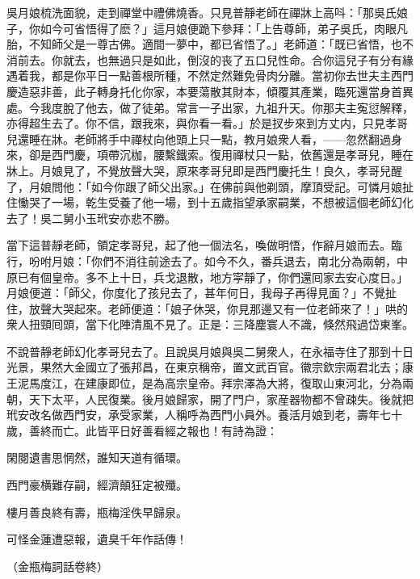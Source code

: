 吳月娘梳洗面貌，走到禪堂中禮佛燒香。只見普靜老師在禪牀上高呌：「那吳氏娘子，你如今可省悟得了麽？」這月娘便跪下參拜：「上告尊師，弟子吳氏，肉眼凡胎，不知師父是一尊古佛。適間一夢中，都已省悟了。」老師道：「既已省悟，也不消前去。你就去，也無過只是如此，倒沒的丧了五口兒性命。合你這兒子有分有緣遇着我，都是你平日一點善根所種，不然定然難免骨肉分離。當初你去世夫主西門慶造惡非善，此子轉身托化你家，本要蕩散其財本，傾覆其產業，臨死還當身首異處。今我度脫了他去，做了徒弟。常言一子出家，九祖升天。你那夫主寃愆解釋，亦得超生去了。你不信，跟我來，與你看一看。」於是扠步來到方丈内，只見孝哥兒還睡在牀。老師將手中禪杖向他頭上只一點，教月娘衆人看，——忽然翻過身來，卻是西門慶，項帶沉枷，腰繫鐵索。復用禪杖只一點，依舊還是孝哥兒，睡在牀上。月娘見了，不覺放聲大哭，原來孝哥兒即是西門慶托生！良久，孝哥兒醒了，月娘問他：「如今你跟了師父出家。」在佛前與他剃頭，摩頂受記。可憐月娘扯住慟哭了一場，乾生受養了他一場，到十五歲指望承家嗣業，不想被這個老師幻化去了！吳二舅小玉玳安亦悲不勝。

當下這普靜老師，領定孝哥兒，起了他一個法名，喚做明悟，作辭月娘而去。臨行，吩咐月娘：「你們不消往前途去了。如今不久，番兵退去，南北分為兩朝，中原已有個皇帝。多不上十日，兵戈退散，地方寜靜了，你們還囘家去安心度日。」月娘便道：「師父，你度化了孩兒去了，甚年何日，我母子再得見面？」不覺扯住，放聲大哭起來。老師便道：「娘子休哭，你見那邊又有一位老師來了！」哄的衆人扭頸囘頭，當下化陣清風不見了。正是：三降塵寰人不識，倏然飛過岱東峯。

不說普靜老師幻化孝哥兒去了。且說吳月娘與吳二舅衆人，在永福寺住了那到十日光景，果然大金國立了張邦昌，在東京稱帝，置文武百官。徽宗欽宗兩君北去；康王泥馬度江，在建康即位，是為高宗皇帝。拜宗澤為大將，復取山東河北，分為兩朝，天下太平，人民復業。後月娘歸家，開了門户，家産器物都不曾疎失。後就把玳安改名做西門安，承受家業，人稱呼為西門小員外。養活月娘到老，壽年七十歲，善終而亡。此皆平日好善看經之報也！有詩為證：

\begin{myquote}
閑閱遺書思惘然，誰知天道有循環。

西門豪横難存嗣，經濟顛狂定被殲。

樓月善良終有壽，瓶梅淫佚早歸泉。

可怪金蓮遭惡報，遺臭千年作話傳！
\end{myquote}

\begin{myquote}
{\kaishu\small\color{gray}（金瓶梅詞話卷終）}
\end{myquote}

\theendnotes


